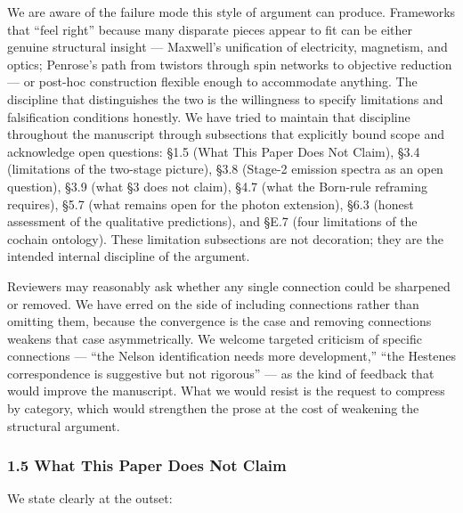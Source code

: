 \documentclass[
]{article}
\begin{document}
We are aware of the failure mode this style of argument can produce.
Frameworks that ``feel right'' because many disparate pieces appear to
fit can be either genuine structural insight --- Maxwell's unification
of electricity, magnetism, and optics; Penrose's path from twistors
through spin networks to objective reduction --- or post-hoc
construction flexible enough to accommodate anything. The discipline
that distinguishes the two is the willingness to specify limitations and
falsification conditions honestly. We have tried to maintain that
discipline throughout the manuscript through subsections that explicitly
bound scope and acknowledge open questions: §1.5 (What This Paper Does
Not Claim), §3.4 (limitations of the two-stage picture), §3.8 (Stage-2
emission spectra as an open question), §3.9 (what §3 does not claim),
§4.7 (what the Born-rule reframing requires), §5.7 (what remains open
for the photon extension), §6.3 (honest assessment of the qualitative
predictions), and §E.7 (four limitations of the cochain ontology). These
limitation subsections are not decoration; they are the intended
internal discipline of the argument.

Reviewers may reasonably ask whether any single connection could be
sharpened or removed. We have erred on the side of including connections
rather than omitting them, because the convergence is the case and
removing connections weakens that case asymmetrically. We welcome
targeted criticism of specific connections --- ``the Nelson
identification needs more development,'' ``the Hestenes correspondence
is suggestive but not rigorous'' --- as the kind of feedback that would
improve the manuscript. What we would resist is the request to compress
by category, which would strengthen the prose at the cost of weakening
the structural argument.

\subsubsection{1.5 What This Paper Does Not
Claim}\label{what-this-paper-does-not-claim}

We state clearly at the outset:
\end{document}
